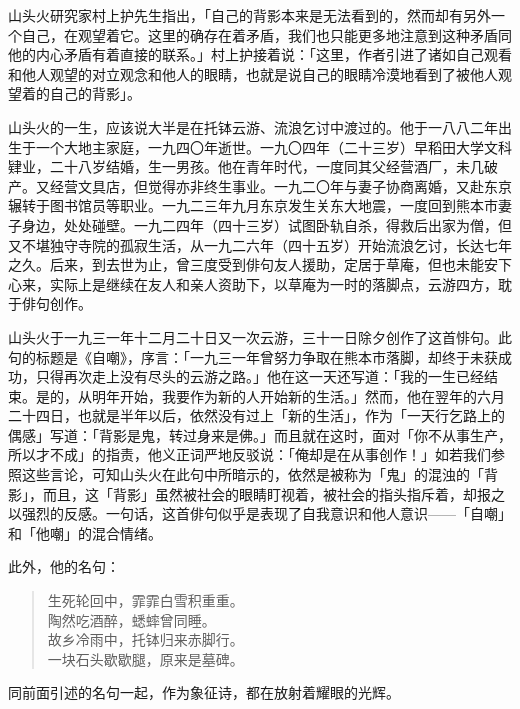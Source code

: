 {山头火研究家村上护先生指出，「自己的背影本来是无法看到的，然而却有另外一个自己，在观望着它。这里的确存在着矛盾，我们也只能更多地注意到这种矛盾同他的内心矛盾有着直接的联系。」村上护接着说：「这里，作者引进了诸如自己观看和他人观望的对立观念和他人的眼睛，也就是说自己的眼睛冷漠地看到了被他人观望着的自己的背影」\footnotemark[7]。


山头火的一生，应该说大半是在托钵云游、流浪乞讨中渡过的。他于一八八二年出生于一个大地主家庭，一九四〇年逝世。一九〇四年（二十三岁）早稻田大学文科肄业，二十八岁结婚，生一男孩。他在青年时代，一度同其父经营酒厂，未几破产。又经营文具店，但觉得亦非终生事业。一九二〇年与妻子协商离婚，又赴东京辗转于图书馆员等职业。一九二三年九月东京发生关东大地震，一度回到熊本市妻子身边，处处碰壁。一九二四年（四十三岁）试图卧轨自杀，得救后出家为僧，但又不堪独守寺院的孤寂生活，从一九二六年（四十五岁）开始流浪乞讨，长达七年之久。后来，到去世为止，曾三度受到俳句友人援助，定居于草庵，但也未能安下心来，实际上是继续在友人和亲人资助下，以草庵为一时的落脚点，云游四方，耽于俳句创作。

山头火于一九三一年十二月二十日又一次云游，三十一日除夕创作了这首悱句。此句的标题是《自嘲》，序言：「一九三一年曾努力争取在熊本市落脚，却终于未获成功，只得再次走上没有尽头的云游之路。」他在这一天还写道：「我的一生已经结束。是的，从明年开始，我要作为新的人开始新的生活。」\footnotemark[8] 然而，他在翌年的六月二十四日，也就是半年以后，依然没有过上「新的生活」，作为「一天行乞路上的偶感」写道：「背影是鬼，转过身来是佛。」\footnotemark[9] 而且就在这时，面对「你不从事生产，所以才不成」的指责，他义正词严地反驳说：「俺却是在从事创作！」如若我们参照这些言论，可知山头火在此句中所暗示的，依然是被称为「鬼」的混浊的「背影」，而且，这「背影」虽然被社会的眼睛盯视着，被社会的指头指斥着，却报之以强烈的反感。一句话，这首俳句似乎是表现了自我意识和他人意识——「自嘲」和「他嘲」的混合情绪。


此外，他的名句：
\begin{quote}
    生死轮回中，霏霏白雪积重重。\\
    陶然吃酒醉，蟋蟀曾同睡。\\
    故乡冷雨中，托钵归来赤脚行。\\
    一块石头歇歇腿，原来是墓碑。
\end{quote}
同前面引述的名句一起，作为象征诗，都在放射着耀眼的光辉。

}
